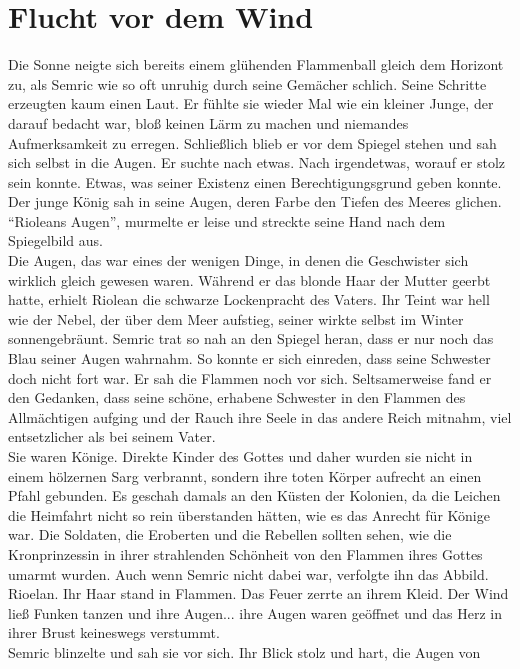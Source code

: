 \chapter{Flucht vor dem Wind}

Die Sonne neigte sich bereits einem glühenden Flammenball gleich dem Horizont 
zu, als Semric wie so 
oft unruhig durch seine Gemächer schlich. Seine Schritte erzeugten kaum einen 
Laut. Er fühlte sie 
wieder Mal wie ein kleiner Junge, der darauf bedacht war, bloß keinen Lärm zu 
machen und niemandes 
Aufmerksamkeit zu erregen. Schließlich blieb er vor dem Spiegel stehen und sah 
sich selbst in die 
Augen. Er suchte nach etwas. Nach irgendetwas, worauf er stolz sein konnte. 
Etwas, was seiner 
Existenz einen Berechtigungsgrund geben konnte. Der junge König sah in seine 
Augen, deren Farbe den
Tiefen des Meeres glichen.\\
``Rioleans Augen'', murmelte er leise und streckte seine Hand nach dem 
Spiegelbild aus. \\
Die Augen, das war eines der wenigen Dinge, in denen die Geschwister sich 
wirklich gleich gewesen 
waren. Während er das blonde Haar der Mutter geerbt hatte, erhielt Riolean die 
schwarze 
Lockenpracht des Vaters. Ihr Teint war hell wie der Nebel, der über dem Meer 
aufstieg, seiner 
wirkte selbst im Winter sonnengebräunt. Semric trat so nah an den Spiegel 
heran, dass er nur noch 
das Blau seiner Augen wahrnahm. So konnte er sich einreden, dass seine 
Schwester doch nicht fort 
war. Er sah die Flammen noch vor sich. Seltsamerweise fand er den Gedanken, 
dass seine schöne, 
erhabene Schwester in den Flammen des Allmächtigen aufging und der Rauch ihre 
Seele in das andere 
Reich mitnahm, viel entsetzlicher als bei seinem Vater.\\
Sie waren Könige. Direkte Kinder des Gottes und daher wurden sie nicht in einem 
hölzernen Sarg 
verbrannt, sondern ihre toten Körper aufrecht an einen Pfahl gebunden. Es 
geschah damals an den 
Küsten der Kolonien, da die Leichen die Heimfahrt nicht so rein überstanden 
hätten, wie es das 
Anrecht für Könige war. Die Soldaten, die Eroberten und die Rebellen sollten 
sehen, wie die 
Kronprinzessin in ihrer strahlenden Schönheit von den Flammen ihres Gottes 
umarmt wurden. Auch wenn 
Semric nicht dabei war, verfolgte ihn das Abbild. Rioelan. Ihr Haar stand in 
Flammen. Das Feuer 
zerrte an ihrem Kleid. Der Wind ließ Funken tanzen und ihre Augen... ihre Augen 
waren geöffnet und 
das Herz in ihrer Brust keineswegs verstummt. \\
Semric blinzelte und sah sie vor sich. Ihr Blick stolz und hart, die Augen von 
